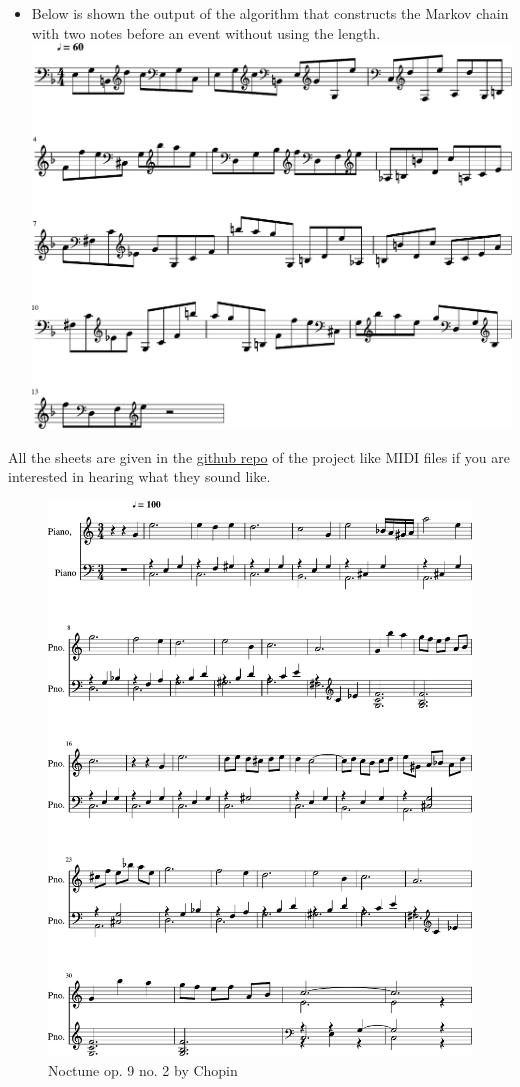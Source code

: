 \documentclass[]{article}
\begin{document}
\begin{itemize}
            \item Below is shown the output of the algorithm that constructs the Markov chain with two notes before an event without using the length.\\
            \includegraphics[scale=0.6]{result_pair_notes}
        \end{itemize} 
        All the sheets are given in the \href{https://github.com/Ro6afF/compmus/tree/master/doc}{github repo} of the project like MIDI files if you are interested in hearing what they sound like.
        \begin{figure}[h!]
            \includegraphics[scale=0.7]{original}
            \caption{Noctune op. 9 no. 2 by Chopin}
            \label{fig:original}
        \end{figure}
\end{document}
